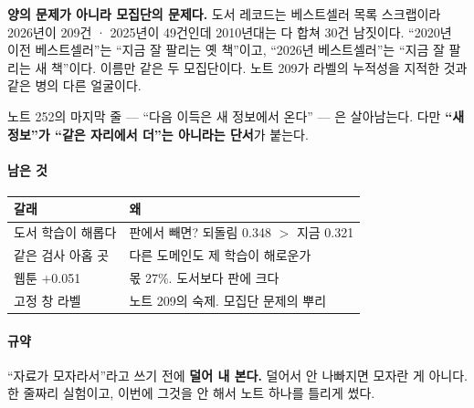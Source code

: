 \documentclass[10pt]{article}
\begin{document}
\textbf{양의 문제가 아니라 모집단의 문제다.} 도서 레코드는 베스트셀러 목록
스크랩이라 2026년이 209건 · 2025년이 49건인데 2010년대는 다 합쳐 30건 남짓이다.
``2020년 이전 베스트셀러''는 ``지금 잘 팔리는 옛 책''이고, ``2026년
베스트셀러''는 ``지금 잘 팔리는 새 책''이다. 이름만 같은 두 모집단이다.
노트 209가 라벨의 누적성을 지적한 것과 같은 병의 다른 얼굴이다.

노트 252의 마지막 줄 --- ``다음 이득은 새 정보에서 온다'' --- 은 살아남는다.
다만 \textbf{``새 정보''가 ``같은 자리에서 더''는 아니라는 단서}가 붙는다.

\paragraph{남은 것}
\begin{center}\small
\begin{tabular}{ll}
\hline
갈래 & 왜 \\
\hline
도서 학습이 해롭다 & 판에서 빼면? 되돌림 0.348 $>$ 지금 0.321 \\
같은 검사 아홉 곳 & 다른 도메인도 제 학습이 해로운가 \\
웹툰 $+$0.051 & 몫 27\%. 도서보다 판에 크다 \\
고정 창 라벨 & 노트 209의 숙제. 모집단 문제의 뿌리 \\
\hline
\end{tabular}
\end{center}

\paragraph{규약} ``자료가 모자라서''라고 쓰기 전에 \textbf{덜어 내 본다.}
덜어서 안 나빠지면 모자란 게 아니다. 한 줄짜리 실험이고, 이번에 그것을
안 해서 노트 하나를 틀리게 썼다.
\end{document}
